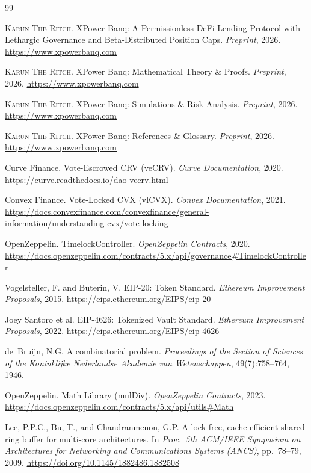 \documentclass[10pt,a4paper,twocolumn]{article}
\begin{document}
\ifbundle\else
\begin{thebibliography}{99}

\textsc{Karun The Ritch}.
\newblock XPower Banq: A Permissionless DeFi Lending Protocol with Lethargic Governance and Beta-Distributed Position Caps.
\newblock \emph{Preprint}, 2026.
\newblock \url{https://www.xpowerbanq.com}

\textsc{Karun The Ritch}.
\newblock XPower Banq: Mathematical Theory \& Proofs.
\newblock \emph{Preprint}, 2026.
\newblock \url{https://www.xpowerbanq.com}

\textsc{Karun The Ritch}.
\newblock XPower Banq: Simulations \& Risk Analysis.
\newblock \emph{Preprint}, 2026.
\newblock \url{https://www.xpowerbanq.com}

\textsc{Karun The Ritch}.
\newblock XPower Banq: References \& Glossary.
\newblock \emph{Preprint}, 2026.
\newblock \url{https://www.xpowerbanq.com}

Curve Finance.
\newblock Vote-Escrowed CRV (veCRV).
\newblock \emph{Curve Documentation}, 2020.
\newblock \url{https://curve.readthedocs.io/dao-vecrv.html}

Convex Finance.
\newblock Vote-Locked CVX (vlCVX).
\newblock \emph{Convex Documentation}, 2021.
\newblock \url{https://docs.convexfinance.com/convexfinance/general-information/understanding-cvx/vote-locking}

OpenZeppelin.
\newblock TimelockController.
\newblock \emph{OpenZeppelin Contracts}, 2020.
\newblock \url{https://docs.openzeppelin.com/contracts/5.x/api/governance#TimelockController}

Vogelsteller, F. and Buterin, V.
\newblock EIP-20: Token Standard.
\newblock \emph{Ethereum Improvement Proposals}, 2015.
\newblock \url{https://eips.ethereum.org/EIPS/eip-20}

Joey Santoro et al.
\newblock EIP-4626: Tokenized Vault Standard.
\newblock \emph{Ethereum Improvement Proposals}, 2022.
\newblock \url{https://eips.ethereum.org/EIPS/eip-4626}

de~Bruijn, N.G.
\newblock A combinatorial problem.
\newblock \emph{Proceedings of the Section of Sciences of the Koninklijke Nederlandse Akademie van Wetenschappen}, 49(7):758--764, 1946.

OpenZeppelin.
\newblock Math Library (mulDiv).
\newblock \emph{OpenZeppelin Contracts}, 2023.
\newblock \url{https://docs.openzeppelin.com/contracts/5.x/api/utils#Math}

Lee, P.P.C., Bu, T., and Chandranmenon, G.P.
\newblock A lock-free, cache-efficient shared ring buffer for multi-core architectures.
\newblock In \emph{Proc.\ 5th ACM/IEEE Symposium on Architectures for Networking and Communications Systems (ANCS)}, pp.\ 78--79, 2009.
\newblock \url{https://doi.org/10.1145/1882486.1882508}

\end{thebibliography}
\fi
\end{document}
